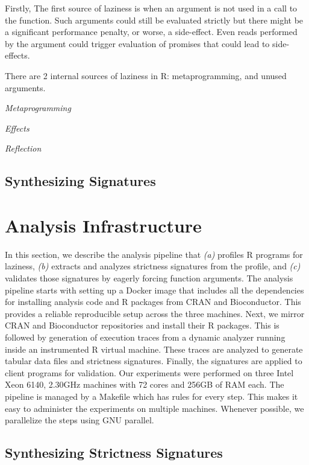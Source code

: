 \documentclass[screen,acmsmall]{acmart}
\begin{document}
Firstly, 
The first source of laziness is when an argument is not
used in a call to the function. Such arguments could still be evaluated strictly
but there might be a significant performance penalty, or worse, a side-effect.
Even reads performed by the argument could trigger evaluation of promises that
could lead to side-effects.

There are 2 internal sources of
laziness in R: metaprogramming, and unused arguments.


\emph{Metaprogramming}

\emph{Effects}

\emph{Reflection}

\subsection{Synthesizing Signatures}

\section{Analysis Infrastructure}
In this section, we describe the analysis pipeline that \emph{(a)} profiles R
programs for laziness, \emph{(b)} extracts and analyzes strictness signatures
from the profile, and \emph{(c)} validates those signatures by eagerly forcing
function arguments. The analysis pipeline starts with setting up a Docker image
that includes all the dependencies for installing analysis code and R packages
from CRAN and Bioconductor. This provides a reliable reproducible setup across
the three machines. Next, we mirror CRAN and Bioconductor\cite{bioc} repositories and
install their R packages. This is followed by generation of execution traces
from a dynamic analyzer running inside an instrumented R virtual machine. These
traces are analyzed to generate tabular data files and strictness signatures.
Finally, the signatures are applied to client programs for validation. Our
experiments were performed on three Intel Xeon 6140, 2.30GHz machines with 72
cores and 256GB of RAM each. The pipeline is managed by a Makefile which has
rules for every step. This makes it easy to administer the experiments on
multiple machines. Whenever possible, we parallelize the steps using GNU
parallel\cite{tange2011a}.

\subsection{Synthesizing Strictness Signatures}
\end{document}
